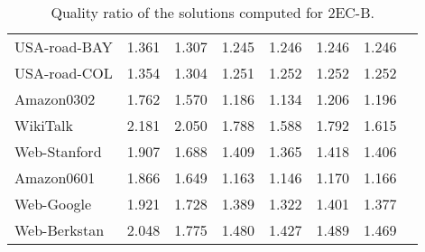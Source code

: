 \documentclass[11pt]{article}
\begin{document}
\begin{table}[!ht]
\begin{adjustbox}{width=\textwidth,totalheight=\textheight,keepaspectratio}
\begin{small}
\begin{tabular}{l|ccccccc}
USA-road-BAY                        & 1.361                              & 1.307                                         & 1.245                                 & 1.246                                        & 1.246                                     & 1.246      \\
USA-road-COL                        & 1.354                              & 1.304                                         & 1.251                                 & 1.252                                        & 1.252                                     & 1.252      \\
Amazon0302                          & 1.762                              & 1.570                                         & 1.186                                 & 1.134                                        & 1.206                                     & 1.196      \\
WikiTalk                            & 2.181                              & 2.050                                         & 1.788                                 & 1.588                                        & 1.792                                     & 1.615      \\
Web-Stanford                        & 1.907                              & 1.688                                         & 1.409                                 & 1.365                                        & 1.418                                     & 1.406      \\
Amazon0601                          & 1.866                              & 1.649                                         & 1.163                                 & 1.146                                        & 1.170                                     & 1.166      \\
Web-Google                          & 1.921                              & 1.728                                         & 1.389                                 & 1.322                                        & 1.401                                     & 1.377          \\
Web-Berkstan                        & 2.048                              & 1.775                                         & 1.480                                 & 1.427                                        & 1.489                                     & 1.469         \\
\hline
\end{tabular}  \end{small}
\end{adjustbox}
\caption{Quality ratio  of the solutions computed for \textsf{2EC-B}.}\label{tab:2ECB}



\end{table}
\end{document}
